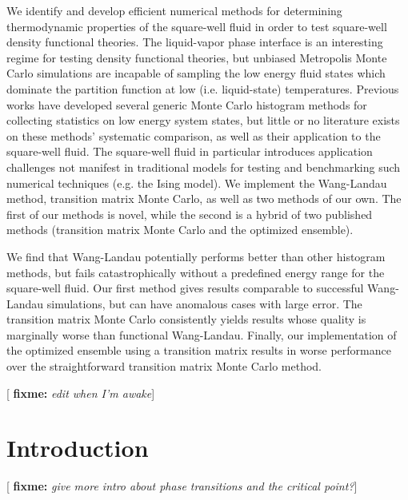 \documentclass[11pt]{article}
\newcommand{\red}[1]{{\bf \color{red} #1}}
\newcommand{\fixme}[1]{[\red{fixme:} \emph{#1}]}
\begin{document}
\thispagestyle{abstract}

We identify and develop efficient numerical methods for determining
thermodynamic properties of the square-well fluid in order to test
square-well density functional theories. The liquid-vapor phase
interface is an interesting regime for testing density functional
theories, but unbiased Metropolis Monte Carlo simulations are
incapable of sampling the low energy fluid states which dominate the
partition function at low (i.e. liquid-state) temperatures. Previous
works have developed several generic Monte Carlo histogram methods for
collecting statistics on low energy system states, but little or no
literature exists on these methods' systematic comparison, as well as
their application to the square-well fluid. The square-well fluid in
particular introduces application challenges not manifest in
traditional models for testing and benchmarking such numerical
techniques (e.g. the Ising model). We implement the Wang-Landau
method, transition matrix Monte Carlo, as well as two methods of our
own. The first of our methods is novel, while the second is a hybrid
of two published methods (transition matrix Monte Carlo and the
optimized ensemble).

We find that Wang-Landau potentially performs better than other
histogram methods, but fails catastrophically without a predefined
energy range for the square-well fluid. Our first method gives results
comparable to successful Wang-Landau simulations, but can have
anomalous cases with large error. The transition matrix Monte Carlo
consistently yields results whose quality is marginally worse than
functional Wang-Landau. Finally, our implementation of the optimized
ensemble using a transition matrix results in worse performance over
the straightforward transition matrix Monte Carlo method.

\fixme{edit when I'm awake}


\newpage


\section{Introduction}
\label{sec:intro}

\fixme{give more intro about phase transitions and the critical
  point?}
\end{document}
